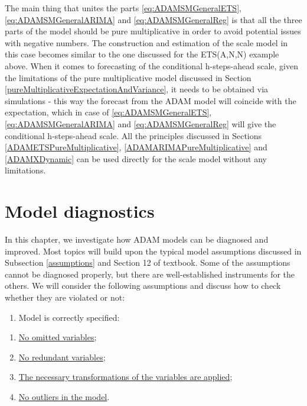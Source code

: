 \documentclass[
]{book}
\providecommand{\tightlist}{%
  \setlength{\itemsep}{0pt}\setlength{\parskip}{0pt}}
\theoremstyle{definition}
\theoremstyle{definition}
\theoremstyle{definition}
\theoremstyle{definition}
\theoremstyle{remark}
\begin{document}
The main thing that unites the parts \eqref{eq:ADAMSMGeneralETS}, \eqref{eq:ADAMSMGeneralARIMA} and \eqref{eq:ADAMSMGeneralReg} is that all the three parts of the model should be pure multiplicative in order to avoid potential issues with negative numbers. The construction and estimation of the scale model in this case becomes similar to the one discussed for the ETS(A,N,N) example above. When it comes to forecasting of the conditional h-steps-ahead scale, given the limitations of the pure multiplicative model discussed in Section \ref{pureMultiplicativeExpectationAndVariance}, it needs to be obtained via simulations - this way the forecast from the ADAM model will coincide with the expectation, which in case of \eqref{eq:ADAMSMGeneralETS}, \eqref{eq:ADAMSMGeneralARIMA} and \eqref{eq:ADAMSMGeneralReg} will give the conditional h-steps-ahead scale. All the principles discussed in Sections \ref{ADAMETSPureMultiplicative}, \ref{ADAMARIMAPureMultiplicative} and \ref{ADAMXDynamic} can be used directly for the scale model without any limitations.

\hypertarget{diagnostics}{%
\chapter{Model diagnostics}\label{diagnostics}}

In this chapter, we investigate how ADAM models can be diagnosed and improved. Most topics will build upon the typical model assumptions discussed in Subsection \ref{assumptions} and Section 12 of \citet{SvetunkovSBA} textbook. Some of the assumptions cannot be diagnosed properly, but there are well-established instruments for the others. We will consider the following assumptions and discuss how to check whether they are violated or not:

\begin{enumerate}
\def\labelenumi{\arabic{enumi}.}
\tightlist
\item
  Model is correctly specified:
\end{enumerate}

\begin{enumerate}
\def\labelenumi{\alph{enumi}.}
\tightlist
\item
  \protect\hyperlink{diagnosticsOmitted}{No omitted variables};
\item
  \protect\hyperlink{diagnosticsRedundant}{No redundant variables};
\item
  \protect\hyperlink{diagnosticsTransformations}{The necessary transformations of the variables are applied};
\item
  \protect\hyperlink{diagnosticsOutliers}{No outliers in the model}.
\end{enumerate}
\end{document}
